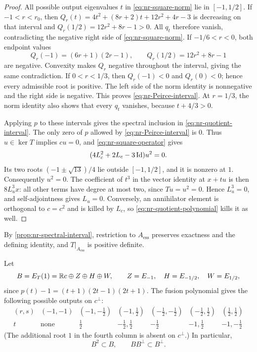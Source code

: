 \begin{proof}
All possible output eigenvalues \(t\) in
\eqref{eq:nr-square-norm} lie in \([-1,1/2]\). If
\(-1<r<r_0\), then \(Q_r(t)=4t^2+(8r+2)t+12r^2+4r-3\)
is decreasing on that interval and
\(Q_r(1/2)=12r^2+8r-1>0\). All \(q_t\) therefore vanish,
contradicting the negative right side of
\eqref{eq:nr-square-norm}. If \(-1/6<r<0\), both endpoint
values
\[
 Q_r(-1)=(6r+1)(2r-1),\qquad Q_r(1/2)=12r^2+8r-1
\]
are negative. Convexity makes \(Q_r\) negative throughout the
interval, giving the same contradiction. If \(0<r<1/3\),
then \(Q_r(-1)<0\) and \(Q_r(0)<0\); hence every admissible
root is positive. The left side of the norm identity is nonnegative
and the right side is negative. This proves
\eqref{eq:nr-Peirce-interval}. At \(r=1/3\), the norm identity
also shows that every \(q_t\) vanishes, because \(t+4/3>0\).

Applying \(p\) to these intervals gives the spectral inclusion in
\eqref{eq:nr-quotient-interval}. The only zero of \(p\) allowed
by \eqref{eq:nr-Peirce-interval} is \(0\). Thus \(u\in\ker T\)
implies \(cu=0\), and \eqref{eq:nr-square-operator} gives
\[
 (4L_c^2+2L_c-3\operatorname{Id})u^2=0.
\]
Its two roots \((-1\pm\sqrt{13})/4\) lie outside
\([-1,1/2]\), and it is nonzero at \(1\). Consequently \(u^2=0\).
The coefficient of \(t^3\) in the vector identity at \(x+tu\)
is then \(8L_u^3x\): all other terms have degree at most two,
since \(Tu=u^2=0\). Hence \(L_u^3=0\), and self-adjointness
gives \(L_u=0\). Conversely, an annihilator element is orthogonal
to \(c=c^2\) and is killed by \(L_c\), so
\eqref{eq:nr-quotient-polynomial} kills it as well.
\end{proof}

By \cref{prop:nr-spectral-interval}, restriction to $A_{\mathrm{ess}}$
preserves exactness and the defining identity, and
$T|_{A_{\mathrm{ess}}}$ is positive definite.

Let
\begin{equation}\label{eq:nr-eigenvalue-one-space}
 B=E_T(1)=\mathbb R c\oplus Z\oplus H\oplus W,
 \qquad Z=E_{-1},\quad H=E_{-1/2},\quad W=E_{1/2},
\end{equation}
since \(p(t)-1=(t+1)(2t-1)(2t+1)\).
The fusion polynomial gives the following possible outputs on
\(c^\perp\):
\[
\begin{array}{c|cccccc}
(r,s)&(-1,-1)&(-1,-\frac12)&(-1,\frac12)&
(-\frac12,-\frac12)&(-\frac12,\frac12)&(\frac12,\frac12)\\ \hline
 t&\text{none}&\frac12&-\frac12,\frac12&-\frac12&
 -1,\frac12&-1,-\frac12
\end{array}
\]
(The additional root \(1\) in the fourth column is absent on
\(c^\perp\).) In particular,
\begin{equation}\label{eq:nr-B-subalgebra}
 B^2\subset B,\qquad BB^\perp\subset B^\perp.
\end{equation}

